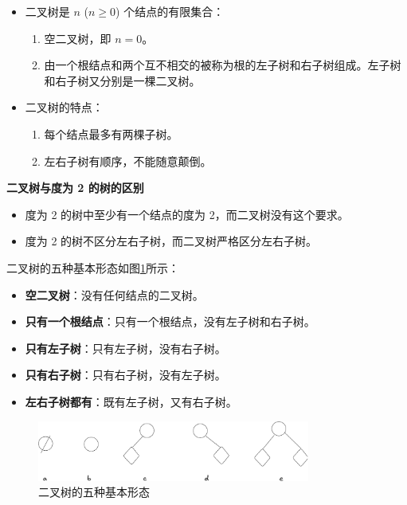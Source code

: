 \documentclass[lang=cn,newtx,10pt,scheme=chinese]{../elegantbook}
\begin{document}
\begin{itemize}
  \item 二叉树是 $n$ ($n \geq 0$) 个结点的有限集合：
  \begin{enumerate}
    \item 空二叉树，即 $n = 0$。
    \item 由一个根结点和两个互不相交的被称为根的左子树和右子树组成。左子树和右子树又分别是一棵二叉树。
  \end{enumerate}
  \item 二叉树的特点：
  \begin{enumerate}
    \item 每个结点最多有两棵子树。
    \item 左右子树有顺序，不能随意颠倒。
  \end{enumerate}
\end{itemize}

\textbf{二叉树与度为 2 的树的区别}

\begin{itemize}
  \item 度为 2 的树中至少有一个结点的度为 2，而二叉树没有这个要求。
  \item 度为 2 的树不区分左右子树，而二叉树严格区分左右子树。
\end{itemize}


二叉树的五种基本形态如图\ref{fig:binary_tree}所示：

\begin{itemize}
  \item \textbf{空二叉树}：没有任何结点的二叉树。
  \item \textbf{只有一个根结点}：只有一个根结点，没有左子树和右子树。
  \item \textbf{只有左子树}：只有左子树，没有右子树。
  \item \textbf{只有右子树}：只有右子树，没有左子树。
  \item \textbf{左右子树都有}：既有左子树，又有右子树。
\end{itemize}



\begin{figure}[!htbp]
  \centering
  \includegraphics[width=0.8\textwidth]{./figure/pdf/cropped/fiveBTree.pdf}
  \caption{二叉树的五种基本形态}
  \label{fig:binary_tree}
\end{figure}
\end{document}
